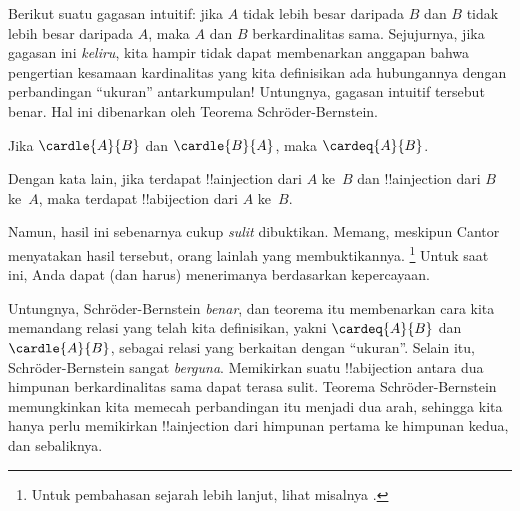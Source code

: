 \documentclass[../../../include/open-logic-section]{subfiles}
\begin{document}


\begin{explain}
Berikut suatu gagasan intuitif: jika $A$ tidak lebih besar daripada $B$ dan
$B$ tidak lebih besar daripada $A$, maka $A$ dan $B$ berkardinalitas sama.
Sejujurnya, jika gagasan ini \emph{keliru}, kita hampir tidak dapat membenarkan
anggapan bahwa pengertian kesamaan kardinalitas yang kita definisikan ada
hubungannya dengan perbandingan ``ukuran'' antarkumpulan!{} Untungnya, gagasan
intuitif tersebut benar. Hal ini dibenarkan oleh Teorema Schr\"oder-Bernstein.
\end{explain}

\begin{thm}
	Jika $\cardle{A}{B}$ dan $\cardle{B}{A}$,
	maka $\cardeq{A}{B}$.
\end{thm}

\begin{explain}
Dengan kata lain, jika terdapat !!a{injection} dari $A$ ke~$B$ dan
!!a{injection} dari $B$ ke~$A$, maka terdapat !!a{bijection} dari $A$ ke~$B$.

Namun, hasil ini sebenarnya cukup \emph{sulit} dibuktikan. Memang, meskipun
Cantor menyatakan hasil tersebut, orang lainlah yang membuktikannya.
\footnote{Untuk pembahasan sejarah lebih lanjut, lihat misalnya
\citet[pp.~165--6]{Potter2004}.}
%
Untuk saat ini, Anda dapat (dan harus) menerimanya berdasarkan kepercayaan.

Untungnya, Schr\"oder-Bernstein \emph{benar}, dan teorema itu membenarkan cara
kita memandang relasi yang telah kita definisikan, yakni $\cardeq{A}{B}$ dan
$\cardle{A}{B}$, sebagai relasi yang berkaitan dengan ``ukuran''. Selain itu,
Schr\"oder-Bernstein sangat \emph{berguna}. Memikirkan suatu !!a{bijection}
antara dua himpunan berkardinalitas sama dapat terasa sulit. Teorema
Schr\"oder-Bernstein memungkinkan kita memecah perbandingan itu menjadi dua
arah, sehingga kita hanya perlu memikirkan !!a{injection} dari himpunan
pertama ke himpunan kedua, dan sebaliknya.
\end{explain}
\end{document}

